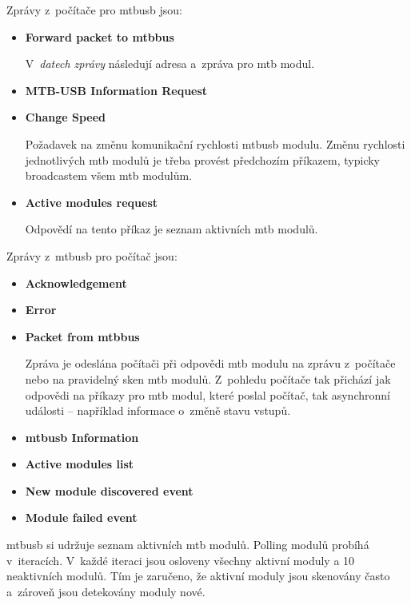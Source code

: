 Zprávy z~počítače pro \gls{mtbusb} jsou:

\begin{itemize}
\item \textbf{Forward packet to \gls{mtbbus}}

V~\textit{datech zprávy} následují adresa a~zpráva pro \gls{mtb} modul.

\item \textbf{MTB-USB Information Request}

\item \textbf{Change Speed}

Požadavek na změnu komunikační rychlosti \gls{mtbusb} modulu. Změnu rychlosti
jednotlivých \gls{mtb} modulů je třeba provést předchozím příkazem, typicky
broadcastem všem \gls{mtb} modulům.

\item \textbf{Active modules request}

Odpovědí na tento příkaz je seznam aktivních \gls{mtb} modulů.

\end{itemize}

Zprávy z~\gls{mtbusb} pro počítač jsou:

\begin{itemize}
\item \textbf{Acknowledgement}
\item \textbf{Error}
\item \textbf{Packet from \gls{mtbbus}}

Zpráva je odeslána počítači při odpovědi \gls{mtb} modulu na zprávu z~počítače
nebo na pravidelný sken \gls{mtb} modulů. Z~pohledu počítače tak přichází jak
odpovědi na příkazy pro \gls{mtb} modul, které poslal počítač, tak asynchronní
události – například informace o~změně stavu vstupů.

\item \textbf{\gls{mtbusb} Information}

\item \textbf{Active modules list}

\item \textbf{New module discovered event}

\item \textbf{Module failed event}

\end{itemize}

\gls{mtbusb} si udržuje seznam aktivních \gls{mtb} modulů. Polling
modulů probíhá v~iteracích. V~každé iteraci jsou osloveny všechny aktivní
moduly a 10 neaktivních modulů. Tím je zaručeno, že aktivní moduly jsou
skenovány často a~zároveň jsou detekovány moduly nové.

